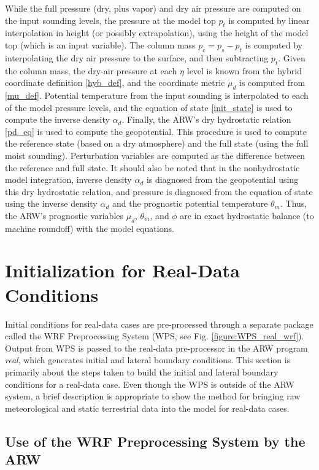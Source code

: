While the full pressure (dry, plus vapor) and dry air pressure are
computed on the input sounding levels, the pressure at the model top $p_{t}$
is computed by linear interpolation in height (or possibly
extrapolation), using the height of the model top (which is an input variable).
The column mass $p_c=p_s-p_t$ is computed by interpolating the dry air
pressure to the surface, and then subtracting $p_{t}$.  Given the
column mass, the dry-air pressure at each $\eta$ level is known from the
hybrid coordinate definition \eqref{hyb_def}, and the coordinate metric 
$\mu_d$ is computed from \eqref{mu_def}.
Potential temperature from the input sounding is interpolated to
each of the model pressure levels, and the equation of state
\eqref{init_state} is used to compute the inverse density 
$\alpha_d$.  Finally, the 
ARW's dry hydrostatic relation \eqref{pd_eq}
is used to compute the geopotential.  This procedure is used to compute
the reference state (based on a dry atmosphere) and the full state
(using the full moist sounding).  Perturbation variables are
computed as the difference between the reference and full state.  It
should also be noted that in the nonhydrostatic model integration,
inverse density $\alpha_d$ is diagnosed from the geopotential using
this dry hydrostatic relation, and pressure is diagnosed from the equation
of state using the inverse density $\alpha_d$ and the prognostic potential
temperature $\theta_m$.  Thus, the ARW's prognostic variables $\mu_d$,
$\theta_m$, and $\phi$ are in exact hydrostatic balance (to machine roundoff) 
with the model equations.

\section{Initialization for Real-Data Conditions}
Initial conditions for real-data cases are pre-processed through a separate 
package called the WRF Preprocessing System (WPS, see Fig. \ref{figure:WPS_real_wrf}).  
Output from WPS is passed to the 
real-data pre-processor in the ARW program {\it real}, which generates initial and lateral boundary
conditions.  This section is primarily about the steps taken to build the
initial and lateral boundary conditions for a real-data case.  Even though the
WPS is outside of the ARW system, a brief description is appropriate to show the 
method for bringing raw meteorological and static terrestrial data into the model
for real-data cases.

\subsection{Use of the WRF Preprocessing System by the ARW}

